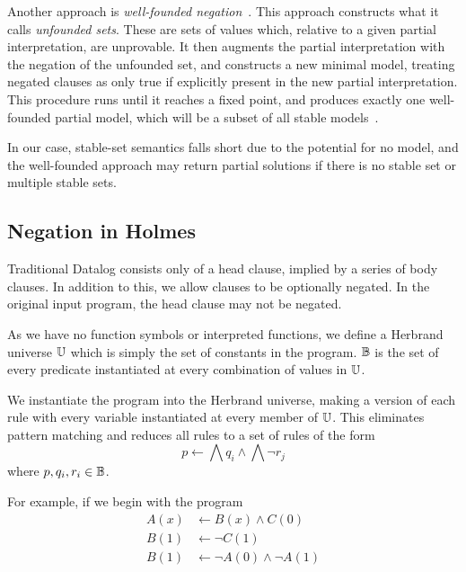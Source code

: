 Another approach is \emph{well-founded negation}~\cite{wellfounded}.
This approach constructs what it calls \emph{unfounded sets}.
These are sets of values which, relative to a given partial interpretation, are unprovable.
It then augments the partial interpretation with the negation of the unfounded set, and constructs a new minimal model, treating negated clauses as only true if explicitly present in the new partial interpretation.
This procedure runs until it reaches a fixed point, and produces exactly one well-founded partial model, which will be a subset of all stable models~\cite{wellfounded}.

In our case, stable-set semantics falls short due to the potential for no model, and the well-founded approach may return partial solutions if there is no stable set or multiple stable sets.
\subsection{Negation in Holmes}
Traditional Datalog consists only of a head clause, implied by a series of body clauses.
In addition to this, we allow clauses to be optionally negated.
In the original input program, the head clause may not be negated.

As we have no function symbols or interpreted functions, we define a Herbrand universe $\mathbb{U}$ which is simply the set of constants in the program.
$\mathbb{B}$ is the set of every predicate instantiated at every combination of values in $\mathbb{U}$.

We instantiate the program into the Herbrand universe, making a version of each rule with every variable instantiated at every member of $\mathbb{U}$.
This eliminates pattern matching and reduces all rules to a set of rules of the form
\[
	p \leftarrow \bigwedge q_i \wedge \bigwedge \neg r_j
\]
where $p, q_i, r_i \in \mathbb{B}$.

For example, if we begin with the program
\begin{align*}
A(x) &\leftarrow B(x) \wedge C(0)\\
B(1) &\leftarrow \neg C(1)\\
B(1) &\leftarrow \neg A(0) \wedge \neg A(1)
\end{align*}

